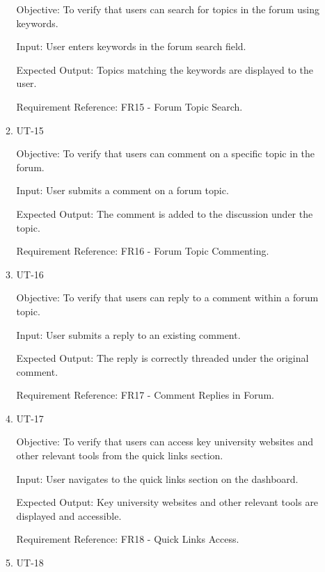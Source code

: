 \documentclass[12pt, titlepage]{article}
\begin{document}
\begin{enumerate}
\begin{enumerate}
        Objective: To verify that users can search for topics in the forum using keywords.
        
        Input: User enters keywords in the forum search field.
        
        Expected Output: Topics matching the keywords are displayed to the user.
        
        Requirement Reference: FR15 - Forum Topic Search.
        
    \item{UT-15\\}\label{UT-15}
    
        Objective: To verify that users can comment on a specific topic in the forum.
        
        Input: User submits a comment on a forum topic.
        
        Expected Output: The comment is added to the discussion under the topic.
        
        Requirement Reference: FR16 - Forum Topic Commenting.
        
    \item{UT-16\\}\label{UT-16}
    
        Objective: To verify that users can reply to a comment within a forum topic.
        
        Input: User submits a reply to an existing comment.
        
        Expected Output: The reply is correctly threaded under the original comment.
        
        Requirement Reference: FR17 - Comment Replies in Forum.
        
    \item{UT-17\\}\label{UT-17}
    
        Objective: To verify that users can access key university websites and other relevant tools from the quick links section.
        
        Input: User navigates to the quick links section on the dashboard.
        
        Expected Output: Key university websites and other relevant tools are displayed and accessible.
        
        Requirement Reference: FR18 - Quick Links Access.
        
    \item{UT-18\\}\label{UT-18}
    

\end{enumerate}
\end{enumerate}
\end{document}
